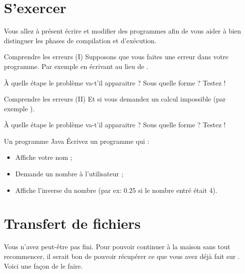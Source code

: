 \documentclass[a4paper,11pt]{style-esi/td}
\begin{document}
\section{S'exercer}  

	Vous allez à présent écrire et modifier des programmes
	afin de vous aider à bien distinguer les phases de compilation et d'exécution. 

	\begin{Exercice}{Comprendre les erreurs (I)}
		Supposons que vous faites une erreur dans votre programme.
		Par exemple en écrivant  
		au lieu de .

		À quelle étape le problème va-t'il apparaitre ?
		Sous quelle forme ? Testez !
	\end{Exercice}

	\begin{Exercice}{Comprendre les erreurs (II)}
		Et si vous demandez un calcul impossible (par exemple ).

		À quelle étape le problème va-t'il apparaitre ?
		Sous quelle forme ? Testez !
	\end{Exercice}

	\begin{Exercice}{Un programme Java}
		Écrivez un programme qui :
		\begin{itemize}
		\item Affiche votre nom ;
		\item Demande un nombre à l'utilisateur ;
		\item Affiche l'inverse du nombre (par ex: $0.25$ si le nombre entré était $4$).
		\end{itemize}
	\end{Exercice}

\section{Transfert de fichiers}  

	Vous n'avez peut-être pas fini. Pour pouvoir continuer à la maison sans tout recommencer, 
    il serait bon de pouvoir récupérer ce que vous avez déjà fait sur .
	Voici une façon de le faire.			
				
\end{document}
